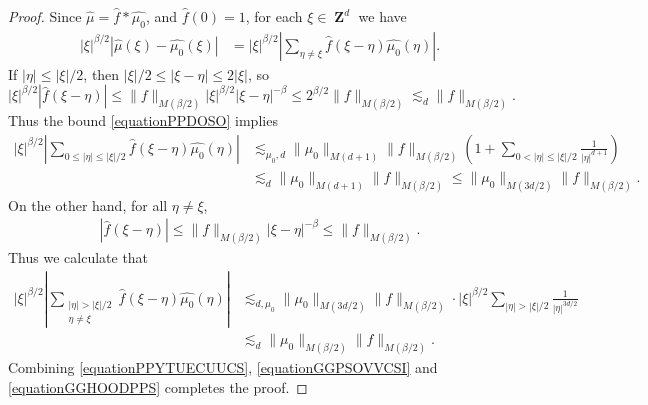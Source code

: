 \documentclass[dvipsnames,letterpaper,12pt]{article}
\numberwithin{equation}{section}
\DeclareMathOperator{\ZZ}{\mathbf{Z}}
\numberwithin{theorem}{section}
\begin{document}
\begin{proof}
    Since $\widehat{\mu} = \widehat{f} * \widehat{\mu_0}$, and $\widehat{f}(0) = 1$, for each $\xi \in \ZZ^d$ we have
    \begin{equation} \label{equationPPYTUECUUCS}
    \begin{split}
        |\xi|^{\beta/2} |\widehat{\mu}(\xi) - \widehat{\mu_0}(\xi)| &= |\xi|^{\beta/2} \left| \sum_{\eta \neq \xi} \widehat{f}(\xi - \eta) \widehat{\mu_0}(\eta) \right|.
    \end{split}
    \end{equation}
    If $|\eta| \leq |\xi|/2$, then $|\xi|/2 \leq |\xi - \eta| \leq 2 |\xi|$, so
    \begin{equation} \label{equationPPDOSO}
        |\xi|^{\beta/2} |\widehat{f}(\xi - \eta)| \leq \| f \|_{M(\beta/2)} |\xi|^{\beta/2} |\xi-\eta|^{-\beta} \leq 2^{\beta/2} \| f \|_{M(\beta/2)} \lesssim_d \| f \|_{M(\beta/2)}.
    \end{equation}
    Thus the bound \eqref{equationPPDOSO} implies
    \begin{equation} \label{equationGGPSOVVCSI}
    \begin{split}
        |\xi|^{\beta/2} \left| \sum_{0 \leq |\eta| \leq |\xi|/2} \widehat{f}(\xi - \eta) \widehat{\mu_0}(\eta) \right| &\lesssim_{\mu_0,d} \| \mu_0 \|_{M(d+1)} \| f \|_{M(\beta/2)} \left( 1 + \sum_{0 < |\eta| \leq |\xi|/2} \frac{1}{|\eta|^{d+1}} \right)\\
        &\lesssim_d \| \mu_0 \|_{M(d+1)} \| f \|_{M(\beta/2)} \leq \| \mu_0 \|_{M(3d/2)} \| f \|_{M(\beta/2)}.
    \end{split}
    \end{equation}
    On the other hand, for all $\eta \neq \xi$,
    \begin{equation} \label{equationGGDPSOX}
    \begin{split}
        |\widehat{f}(\xi - \eta)| \leq  \| f \|_{M(\beta/2)} |\xi - \eta|^{-\beta} \leq \| f \|_{M(\beta/2)}.
    \end{split}
    \end{equation}
    Thus we calculate that
    \begin{equation} \label{equationGGHOODPPS}
    \begin{split}
        |\xi|^{\beta/2} \left| \sum_{\substack{|\eta| > |\xi|/2\\ \eta \neq \xi}} \widehat{f}(\xi - \eta) \widehat{\mu_0}(\eta) \right| &\lesssim_{d,\mu_0} \| \mu_0 \|_{M(3d/2)} \| f \|_{M(\beta/2)} \cdot |\xi|^{\beta/2} \sum_{|\eta| > |\xi|/2} \frac{1}{|\eta|^{3d/2}}\\
        &\lesssim_d \| \mu_0 \|_{M(\beta/2)} \| f \|_{M(\beta/2)}.
    \end{split}
    \end{equation}
    Combining \eqref{equationPPYTUECUUCS}, \eqref{equationGGPSOVVCSI} and \eqref{equationGGHOODPPS} completes the proof.
\end{proof}
\end{document}

